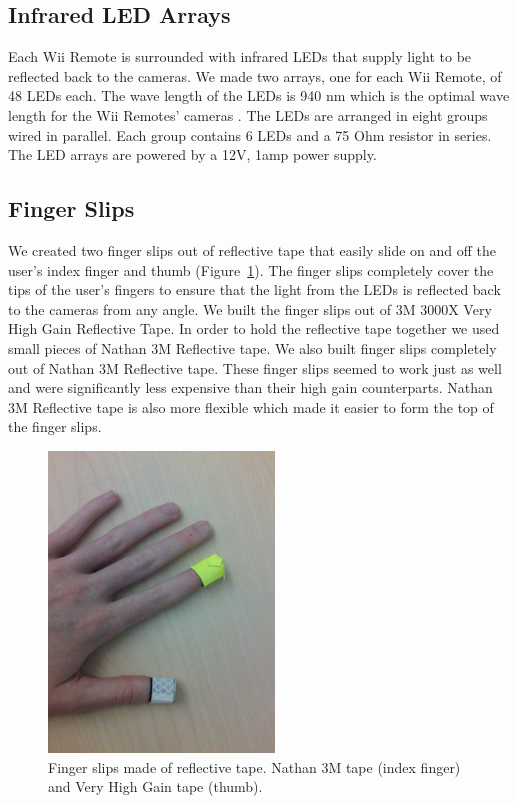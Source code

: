 \documentclass[a4paper,twoside]{article}
\begin{document}
\subsection{Infrared LED Arrays}
Each Wii Remote is surrounded with infrared LEDs that supply light to be reflected back to the cameras. We made two arrays, one for each Wii Remote, of 48 LEDs each. The wave length of the LEDs is 940 nm which is the optimal wave length for the Wii Remotes' cameras \cite{WiiBrew10}. The LEDs are arranged in eight groups wired in parallel. Each group contains 6 LEDs and a 75 Ohm resistor in series. The LED arrays are powered by a 12V, 1amp power supply.
 
\subsection{Finger Slips}
We created two finger slips out of reflective tape that easily slide on and off the user's index finger and thumb (Figure~\ref{fingerslips}). The finger slips completely cover the tips of the user's fingers to ensure that the light from the LEDs is reflected back to the cameras from any angle. We built the finger slips out of 3M 3000X Very High Gain Reflective Tape. In order to hold the reflective tape together we used small pieces of Nathan 3M Reflective tape. We also built finger slips completely out of Nathan 3M Reflective tape. These finger slips seemed to work just as well and were significantly less expensive than their high gain counterparts. Nathan 3M Reflective tape is also more flexible which made it easier to form the top of the finger slips. 
\begin{figure}[h]
\begin{center}
\includegraphics[width = 6cm]{fingerslips.png}
\end{center}
\caption{Finger slips made of reflective tape.  Nathan 3M tape (index finger) and Very High Gain tape (thumb).}
\label{fingerslips}
\end{figure}
\end{document}
